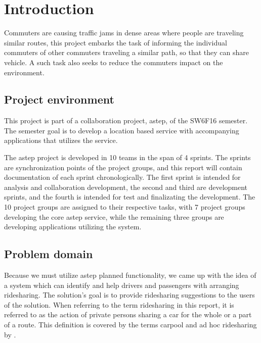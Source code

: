 \chapter{Introduction}\label{ch:introduction}


Commuters are causing traffic jams in dense areas where people are traveling similar routes, this project embarks the task of informing the individual commuters of other commuters traveling a similar path, so that they can share vehicle.
A such task also seeks to reduce the commuters impact on the environment.


\section{Project environment}
This project is part of a collaboration project, \gls{astep}, of the SW6F16 semester.
The semester goal is to develop a location based service with accompanying applications that utilizes the service. 

The \gls{astep} project is developed in 10 teams in the span of 4 sprints.
The sprints are synchronization points of the project groups, and this report will contain documentation of each sprint chronologically.
The first sprint is intended for analysis and collaboration development, the second and third are development sprints, and the fourth is intended for test and finalizating the development.
The 10 project groups are assigned to their respective tasks, with 7 project groups developing the core \gls{astep} service, while the remaining three groups are developing applications utilizing the system.



\section{Problem domain}
Because we must utilize \gls{astep} planned functionality, we came up with the idea of a system which can identify and help drivers and passengers with arranging ridesharing.
The solution's goal is to provide ridesharing suggestions to the users of the solution.
When referring to the term ridesharing in this report, it is referred to as the action of private persons sharing a car for the whole or a part of a route. 
This definition is covered by the terms carpool and ad hoc ridesharing by \citet{doi:10.1080/01441647.2011.621557}.  

